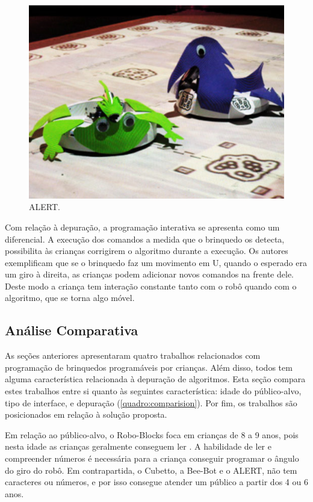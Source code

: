 \begin{figure}[!h]
    \centering
    \includegraphics[width=.6\linewidth,fbox]{figs/alert.png}
    \caption{ALERT.}
    \label{fig:alert}
\end{figure}

Com relação à depuração, a programação interativa se apresenta como um diferencial. A execução dos comandos a medida que o brinquedo os detecta, possibilita às crianças corrigirem o algoritmo durante a execução. Os autores exemplificam que se o brinquedo faz um movimento em U, quando o esperado era um giro à direita, as crianças podem adicionar novos comandos na frente dele. Deste modo a criança tem interação constante tanto com o robô quando com o algoritmo, que se torna algo móvel. 

\subsection{Análise Comparativa}

As seções anteriores apresentaram quatro trabalhos relacionados com programação de brinquedos programáveis por crianças. Além disso, todos tem alguma característica relacionada à depuração de algoritmos. Esta seção compara estes trabalhos entre si quanto às seguintes característica: idade do público-alvo, tipo de interface, e depuração (\autoref{quadro:comparision}). Por fim, os trabalhos são posicionados em relação à solução proposta.

Em relação ao público-alvo, o Robo-Blocks foca em crianças de 8 a 9 anos, pois nesta idade as crianças geralmente conseguem ler \cite{committee_on_the_prevention_of_reading_difficulties_in_young_children_preventing_1998}. A habilidade de ler e compreender números é necessária para a criança conseguir programar o ângulo do giro do robô. Em contrapartida, o Cubetto, a Bee-Bot e o ALERT, não tem caracteres ou números, e por isso consegue atender um público a partir dos 4 ou 6 anos.

